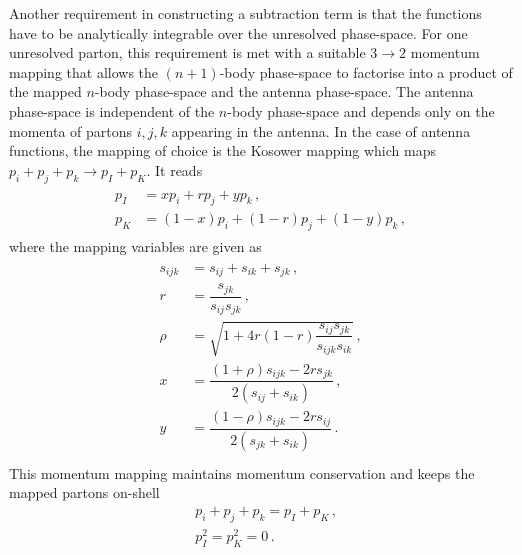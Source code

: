 \documentclass[main.tex]{subfiles}
\begin{document}
    Another requirement in constructing a subtraction term
    is that the functions have to be analytically integrable
    over the unresolved phase-space.
    For one unresolved parton, this requirement is met with a
    suitable $3 \rightarrow 2$ momentum mapping that allows
    the $(n+1)$-body phase-space to factorise into a product of
    the mapped $n$-body phase-space and the antenna phase-space.
    The antenna phase-space is independent of the $n$-body phase-space
    and depends only on the momenta of partons $i, j, k$ appearing
    in the antenna.
    In the case of antenna functions, the mapping of choice is
    the Kosower mapping \cite{Kosower:2002su} which maps
    $p_{i} + p_{j} + p_{k} \rightarrow p_{I} + p_{K}$. It reads
    \begin{align}\label{eqn:kosower_mapping}
        \begin{split}
        p_{I} &= x p_{i} + r p_{j} + y p_{k} \, , \\
        p_{K} &= (1-x) p_{i} + (1-r) p_{j} + (1-y) p_{k} \, ,
        \end{split}
    \end{align}
    where the mapping variables are given as
    \begin{align}\label{eqn:kosower_variables}
        \begin{split}
        s_{ijk} &= s_{ij} + s_{ik} + s_{jk} \, , \\
        r &= \dfrac{s_{jk}}{s_{ij}s_{jk}} \, , \\
        \rho &= \sqrt{1 + 4r(1-r)\dfrac{s_{ij}s_{jk}}{s_{ijk}{s_{ik}}}} \, , \\
        x &= \dfrac{(1+\rho)s_{ijk}-2r s_{jk}}{2(s_{ij}+s_{ik})} \, , \\
        y &= \dfrac{(1-\rho)s_{ijk}-2r s_{ij}}{2(s_{jk}+s_{ik})} \, . \\
        \end{split}
    \end{align}
    This momentum mapping maintains momentum conservation
    and keeps the mapped partons on-shell
    \begin{equation}\label{eqn:kosower_conditions}
        \begin{split}
        &p_{i} + p_{j} + p_{k} = p_{I} + p_{K} \, , \\
        &p_{I}^{2} = p_{K}^{2} = 0 \, .
        \end{split}
    \end{equation}
\end{document}
